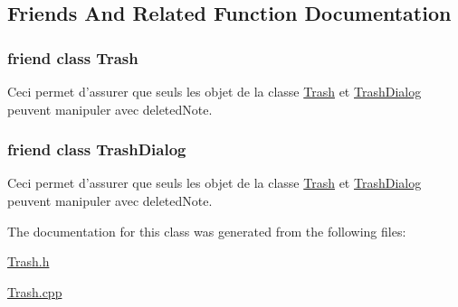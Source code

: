 \subsection{Friends And Related Function Documentation}
\hypertarget{class_deleted_note_aa5b165af6155aa1d6b8c634a27eae73f}{
\subsubsection[{Trash}]{\setlength{\rightskip}{0pt plus 5cm}friend class {\bf Trash}\hspace{0.3cm}{\ttfamily [friend]}}}\label{class_deleted_note_aa5b165af6155aa1d6b8c634a27eae73f}
Ceci permet d'assurer que seuls les objet de la classe \hyperlink{class_trash}{Trash} et \hyperlink{class_trash_dialog}{Trash\-Dialog} peuvent manipuler avec deleted\-Note. \hypertarget{class_deleted_note_abd99e75afa232a2ca91c06161fc1e847}{
\subsubsection[{Trash\-Dialog}]{\setlength{\rightskip}{0pt plus 5cm}friend class {\bf Trash\-Dialog}\hspace{0.3cm}{\ttfamily [friend]}}}\label{class_deleted_note_abd99e75afa232a2ca91c06161fc1e847}
Ceci permet d'assurer que seuls les objet de la classe \hyperlink{class_trash}{Trash} et \hyperlink{class_trash_dialog}{Trash\-Dialog} peuvent manipuler avec deleted\-Note. 

The documentation for this class was generated from the following files\-:\begin{DoxyCompactItemize}
\item 
\hyperlink{_trash_8h}{Trash.\-h}\item 
\hyperlink{_trash_8cpp}{Trash.\-cpp}\end{DoxyCompactItemize}
